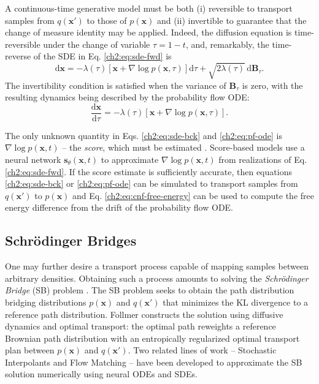 A continuous-time generative model must be both (i) reversible to transport samples from $q(\mathbf{x}')$ to those of $p(\mathbf{x})$ and (ii) invertible to guarantee that the change of measure identity may be applied. Indeed, the diffusion equation is time-reversible under the change of variable $\tau = 1 - t$, and, remarkably, the time-reverse of the SDE in Eq. \ref{ch2:eq:sde-fwd} is
\begin{equation}
    \label{ch2:eq:sde-bck}
    \mathrm{d}\mathbf{x} = -\lambda(\tau) \left[ \mathbf{x} + \nabla \log p(\mathbf{x},\tau) \right] \mathrm{d}\tau + \sqrt{2 \lambda(\tau)} \, \mathrm{d}\mathbf{B}_\tau.
\end{equation}
The invertibility condition is satisfied when the variance of $\mathbf{B}_\tau$ is zero, with the resulting dynamics being described by the probability flow ODE:
\begin{equation}
    \label{ch2:eq:pf-ode}
    \frac{\mathrm{d}\mathbf{x}}{\mathrm{d}\tau} = -\lambda(\tau) \left[ \mathbf{x} + \nabla \log p(\mathbf{x},\tau) \right].
\end{equation}

The only unknown quantity in Eqs. \ref{ch2:eq:sde-bck} and \ref{ch2:eq:pf-ode} is $\nabla \log p(\mathbf{x},t)$ -- the {\it score}, which must be estimated \cite{hyvarinen-score}. Score-based models use a neural network $\mathbf{s}_\theta(\mathbf{x},t)$ to approximate $\nabla \log p(\mathbf{x},t)$ from realizations of Eq. \ref{ch2:eq:sde-fwd}. If the score estimate is sufficiently accurate, then equations \ref{ch2:eq:sde-bck} or \ref{ch2:eq:pf-ode} can be simulated to transport samples from $q(\mathbf{x}')$ to $p(\mathbf{x})$ and Eq. \ref{ch2:eq:cnf-free-energy} can be used to compute the free energy difference from the drift of the probability flow ODE.

\subsection{Schr\"odinger Bridges}
\label{ch2:sec:sbm}

One may further desire a transport process capable of mapping samples between arbitrary densities. Obtaining such a process amounts to solving the {\it Schr\"odinger Bridge} (SB) problem \cite{schrodinger-1932,leonard-2014,debortoli-2021,chen-2021}. The SB problem seeks to obtain the path distribution bridging distributions $p(\mathbf{x})$ and $q(\mathbf{x}')$ that minimizes the KL divergence to a reference path distribution. Follmer \cite{follmer1988} constructs the solution using diffusive dynamics and optimal transport: the optimal path reweights a reference Brownian path distribution with an entropically regularized optimal transport plan between $p(\mathbf{x})$ and $q(\mathbf{x}')$\cite{leonard-2014}. Two related lines of work -- Stochastic Interpolants \cite{stochastic-interpolants,nfs-with-si,si-with-couplings} and Flow Matching \cite{CFM,flow-matching-ot,sb-CFM} -- have been developed to approximate the SB solution numerically using neural ODEs and SDEs.

